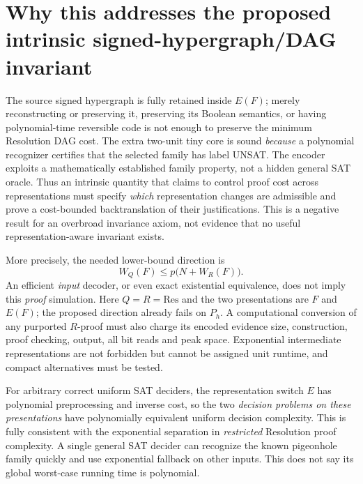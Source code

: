 \documentclass[11pt]{article}
\begin{document}
\section*{Why this addresses the proposed intrinsic signed-hypergraph/DAG invariant}
The source signed hypergraph is fully retained inside $E(F)$; merely reconstructing or preserving it, preserving its Boolean semantics, or having polynomial-time reversible code is not enough to preserve the minimum Resolution DAG cost. The extra two-unit tiny core is sound \emph{because} a polynomial recognizer certifies that the selected family has label UNSAT. The encoder exploits a mathematically established family property, not a hidden general SAT oracle. Thus an intrinsic quantity that claims to control proof cost across representations must specify \emph{which} representation changes are admissible and prove a cost-bounded backtranslation of their justifications. This is a negative result for an overbroad invariance axiom, not evidence that no useful representation-aware invariant exists.

More precisely, the needed lower-bound direction is
\[
 W_Q(F)\le p\bigl(N+W_R(F)\bigr).
\]
An efficient \emph{input} decoder, or even exact existential equivalence, does not imply this \emph{proof} simulation. Here $Q=R=\mathrm{Res}$ and the two presentations are $F$ and $E(F)$; the proposed direction already fails on $P_h$. A computational conversion of any purported $R$-proof must also charge its encoded evidence size, construction, proof checking, output, all bit reads and peak space. Exponential intermediate representations are not forbidden but cannot be assigned unit runtime, and compact alternatives must be tested.

For arbitrary correct uniform SAT deciders, the representation switch $E$ has polynomial preprocessing and inverse cost, so the two \emph{decision problems on these presentations} have polynomially equivalent uniform decision complexity. This is fully consistent with the exponential separation in \emph{restricted} Resolution proof complexity. A single general SAT decider can recognize the known pigeonhole family quickly and use exponential fallback on other inputs. This does not say its global worst-case running time is polynomial.
\end{document}
